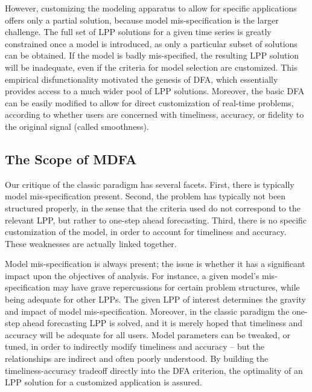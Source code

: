 \documentclass[a4paper]{book}
\begin{document}
However, customizing the modeling apparatus to allow for specific applications offers only a partial solution, because
 model mis-specification is the larger challenge.  The full set of LPP solutions for a given time series is greatly
 constrained once a model is introduced, as only a particular subset of solutions can be obtained.  If the model is
 badly mis-specified, the resulting LPP solution will be inadequate, even if the criteria for model selection are customized.
 This empirical disfunctionality motivated the genesis of DFA, which essentially provides access to a much wider
 pool of LPP solutions.  Moreover, the basic DFA can be easily modified to allow for direct customization of 
real-time problems, according to whether users are concerned with timeliness, accuracy, or fidelity to the original signal (called
 smoothness).  
 


\subsection{The Scope of MDFA}

Our critique of the classic paradigm has several facets.  First, there is typically model mis-specification present.  Second, the problem
 has typically not been structured properly, in the sense that the criteria used do not correspond to the relevant LPP, but rather to
   one-step ahead forecasting.  Third, there is no specific customization of the model, in order to account for timeliness and accuracy.
 These weaknesses are actually linked together.  

Model mis-specification is always present; the issue is whether it has a significant impact upon the objectives of analysis.  For instance,
 a given model's mis-specification may have grave repercussions for certain problem structures, while being adequate for other LPPs.
 The given LPP of interest determines the gravity and impact of model mis-specification.  Moreover, in the classic paradigm the one-step
 ahead forecasting LPP is solved, and it is merely hoped that timeliness and accuracy will be adequate for all users.  Model parameters
 can be tweaked, or tuned, in order to indirectly modify timeliness and accuracy -- but the relationships are indirect and often poorly
 understood.  By building the timeliness-accuracy tradeoff directly into the DFA criterion, the optimality of an LPP solution for a
 customized application is assured.
\end{document}

